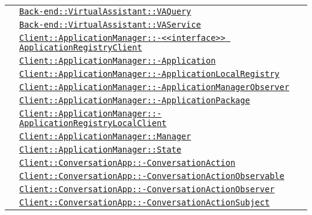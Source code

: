 \begin{longtable}{|>{\centering}m{3cm}|m{10cm}<{\centering}|}
& \hyperref[Back-end::VirtualAssistant::VAQuery]{\texttt{Back-end::VirtualAssistant::VAQuery}}\\
& \hyperref[Back-end::VirtualAssistant::VAService]{\texttt{Back-end::VirtualAssistant::VAService}}\\
& \hyperref[Client::ApplicationManager::<<interface>> ApplicationRegistryClient]{\texttt{Client::ApplicationManager::-\linebreak <<interface>> ApplicationRegistryClient}}\\
& \hyperref[Client::ApplicationManager::Application]{\texttt{Client::ApplicationManager::-\linebreak Application}}\\
& \hyperref[Client::ApplicationManager::ApplicationLocalRegistry]{\texttt{Client::ApplicationManager::-\linebreak ApplicationLocalRegistry}}\\
& \hyperref[Client::ApplicationManager::ApplicationManagerObserver]{\texttt{Client::ApplicationManager::-\linebreak ApplicationManagerObserver}}\\
& \hyperref[Client::ApplicationManager::ApplicationPackage]{\texttt{Client::ApplicationManager::-\linebreak ApplicationPackage}}\\
& \hyperref[Client::ApplicationManager::ApplicationRegistryLocalClient]{\texttt{Client::ApplicationManager::-\linebreak ApplicationRegistryLocalClient}}\\
& \hyperref[Client::ApplicationManager::Manager]{\texttt{Client::ApplicationManager::Manager}}\\
& \hyperref[Client::ApplicationManager::State]{\texttt{Client::ApplicationManager::State}}\\
& \hyperref[Client::ConversationApp::ConversationAction]{\texttt{Client::ConversationApp::-\linebreak ConversationAction}}\\
& \hyperref[Client::ConversationApp::ConversationActionObservable]{\texttt{Client::ConversationApp::-\linebreak ConversationActionObservable}}\\
& \hyperref[Client::ConversationApp::ConversationActionObserver]{\texttt{Client::ConversationApp::-\linebreak ConversationActionObserver}}\\
& \hyperref[Client::ConversationApp::ConversationActionSubject]{\texttt{Client::ConversationApp::-\linebreak ConversationActionSubject}}\\

\end{longtable}
